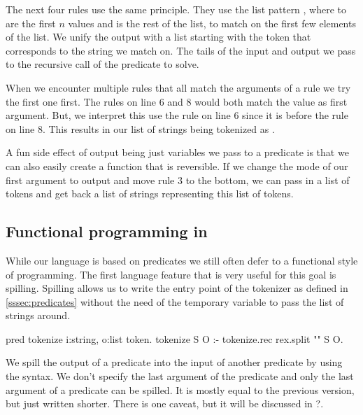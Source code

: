 \documentclass[thesis.tex]{subfiles}
\begin{document}
{{The next four rules use the same principle. They use the list pattern \elpii{[E1, ..., En | TL]}, where  to  are the first $n$ values and  is the rest of the list, to match on the first few elements of the list. We unify the output with a list starting with the token that corresponds to the string we match on. The tails of the input and output we pass to the recursive call of the predicate to solve.

When we encounter multiple rules that all match the arguments of a rule we try the first one first. The rules on line 6 and 8 would both match the value \elpii{["/", "/", "="]} as first argument. But, we interpret this use the rule on line 6 since it is before the rule on line 8. This results in our list of strings being tokenized as .

A fun side effect of output being just variables we pass to a predicate is that we can also easily create a function that is reversible. If we change the mode of our first argument to output and move rule 3 to the bottom, we can pass in a list of tokens and get back a list of strings representing this list of tokens.

\subsection{Functional programming in \elpi}
While our language is based on predicates we still often defer to a functional style of programming. The first language feature that is very useful for this goal is spilling. Spilling allows us to write the entry point of the tokenizer as defined in \cref*{sssec:predicates} without the need of the temporary variable to pass the list of strings around.
\begin{elpicode}
  pred tokenize i:string, o:list token.
  tokenize S O :- tokenize.rec {rex.split "" S} O.
\end{elpicode}

We spill the output of a predicate into the input of another predicate by using the \elpii{{ }} syntax. We don't specify the last argument of the predicate and only the last argument of a predicate can be spilled. It is mostly equal to the previous version, but just written shorter. There is one caveat, but it will be discussed in ?.

}}
\end{document}
